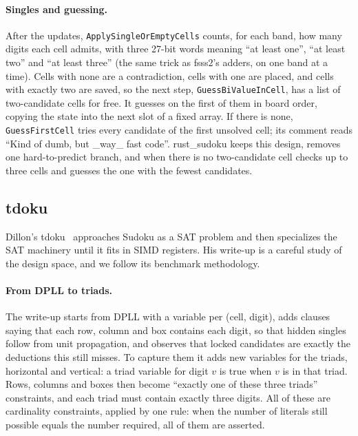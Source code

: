 \documentclass[11pt]{article}
\theoremstyle{definition}
\theoremstyle{plain}
\begin{document}
\paragraph{Singles and guessing.} After the updates, \texttt{ApplySingleOrEmptyCells} counts, for each band, how many
digits each cell admits, with three 27-bit words meaning ``at least one'', ``at least two'' and ``at least three''
(the same trick as fsss2's adders, on one band at a time). Cells with none are a contradiction, cells with one are
placed, and cells with exactly two are saved, so the next step, \texttt{GuessBiValueInCell}, has a list of
two-candidate cells for free. It guesses on the first of them in board order, copying the state into the next slot of
a fixed array. If there is none, \texttt{GuessFirstCell} tries every candidate of the first unsolved cell; its
comment reads ``Kind of dumb, but \_way\_ fast code''. rust\_sudoku keeps this design, removes one hard-to-predict
branch, and when there is no two-candidate cell checks up to three cells and guesses the one with the fewest
candidates.

\subsection{tdoku}

Dillon's tdoku~\cite{dillon2019tdoku,dillon2019nerdsniped} approaches Sudoku as a SAT problem and then specializes the
SAT machinery until it fits in SIMD registers. His write-up is a careful study of the design space, and we follow its
benchmark methodology.

\paragraph{From DPLL to triads.} The write-up starts from DPLL with a variable per (cell, digit), adds clauses saying
that each row, column and box contains each digit, so that hidden singles follow from unit propagation, and observes
that locked candidates are exactly the deductions this still misses. To capture them it adds new variables for the
triads, horizontal and vertical: a triad variable for digit $v$ is true when $v$ is in that triad. Rows,
columns and boxes then become ``exactly one of these three triads'' constraints, and each triad must contain exactly
three digits. All of these are cardinality constraints, applied by one rule: when the number of literals still possible
equals the number required, all of them are asserted.
\end{document}
